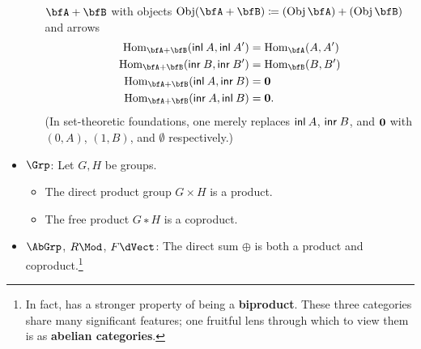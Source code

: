 \documentclass[12pt,twoside]{reedthesis}
\newcommand{\define}[1]{\textbf{#1}} %
\begin{document}
\begin{example}
\begin{itemize}
\begin{itemize}
          $\bfA+\bfB$ with objects
          $\Obj (\bfA+\bfB) \coloneqq (\Obj\bfA)+(\Obj\bfB)$
          and arrows
          \begin{align*}
            \Hom_{\bfA+\bfB}(\apply{\inl}{A}, \apply{\inl}{A'}) &= \Hom_{\bfA}(A,A') \\
            \Hom_{\bfA+\bfB}(\apply{\inr}{B}, \apply{\inr}{B'}) &= \Hom_{\bfB}(B,B') \\
            \Hom_{\bfA+\bfB}(\apply{\inl}{A}, \apply{\inr}{B}) &= \emptytype \\
            \Hom_{\bfA+\bfB}(\apply{\inr}{A}, \apply{\inl}{B}) &= \emptytype.
          \end{align*}
          (In set-theoretic foundations, one merely replaces $\mathsf{inl}\hspace{0.23em} A$,
          $\mathsf{inr}\hspace{0.23em} B$, and $\mathbf{0}$ with $(0,A)$, $(1,B)$, and
          $\emptyset$ respectively.)
      \end{itemize}
    \item $\Grp$: Let $G,H$ be groups.
      \begin{itemize}\renewcommand{\labelitemi}{$∘$}
        \itemsep-0.2em
        \item \vspace{-0.6em} The direct product group $G×H$ is a product.
        \item The free product $G∗H$ is a coproduct.
      \end{itemize}
    \item $\AbGrp$, $R\Mod$, $F\dVect$: The direct sum $⊕$ is both a product and
      coproduct.\footnote{In fact, has a stronger property of being a
      \define{biproduct}. These three categories share many significant
      features; one fruitful lens through which to view them is as
      \define{abelian categories}.} 
  \end{itemize}
\end{example}
\end{document}
